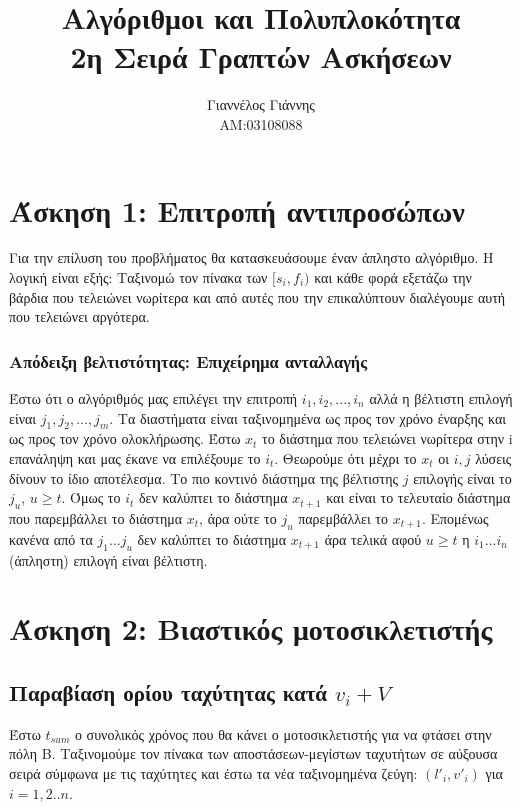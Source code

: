 \documentclass[a4paper,12pt]{report}
\title{ Αλγόριθμοι και Πολυπλοκότητα \\ 2η Σειρά Γραπτών Ασκήσεων}
\author{Γιαννέλος Γιάννης\\ΑΜ:03108088}
\begin{document}
\maketitle

\section*{Άσκηση 1: Επιτροπή αντιπροσώπων}
Για την επίλυση του προβλήματος θα κατασκευάσουμε έναν άπληστο αλγόριθμο. Η λογική είναι εξής: Ταξινομώ τον πίνακα των $[s_i,f_i)$ και κάθε φορά εξετάζω την βάρδια που τελειώνει νωρίτερα και από αυτές που την επικαλύπτουν διαλέγουμε αυτή που τελειώνει αργότερα.
\subsubsection*{Απόδειξη βελτιστότητας: Επιχείρημα ανταλλαγής}
Έστω ότι ο αλγόριθμός μας επιλέγει την επιτροπή $i_1,i_2,...,i_n$ αλλά η βέλτιστη επιλογή είναι $j_1,j_2,...,j_m$. Τα διαστήματα είναι ταξινομημένα ως προς τον χρόνο έναρξης και ως προς τον χρόνο ολοκλήρωσης. Έστω $x_t$ το διάστημα που τελειώνει νωρίτερα στην i επανάληψη και μας έκανε να επιλέξουμε το $i_t$. Θεωρούμε ότι μέχρι το $x_t$ οι $i,j$ λύσεις δίνουν το ίδιο αποτέλεσμα. Το πιο κοντινό διάστημα της βέλτιστης $j$ επιλογής είναι το $j_u$, $u\geq t$. Όμως το $i_t$ δεν καλύπτει το διάστημα $x_{t+1}$ και είναι το τελευταίο διάστημα που παρεμβάλλει το διάστημα $x_t$, άρα ούτε το $j_u$ παρεμβάλλει το $x_{t+1}$. Επομένως κανένα από τα $j_1...j_u$ δεν καλύπτει το διάστημα $x_{t+1}$ άρα τελικά αφού $u \geq t$ η $i_1...i_n$ (άπληστη) επιλογή είναι βέλτιστη.


\section*{Άσκηση 2: Βιαστικός μοτοσικλετιστής}
\subsection*{Παραβίαση ορίου ταχύτητας κατά $v_i+V$}
Έστω $t_{sum}$ ο συνολικός χρόνος που θα κάνει ο μοτοσικλετιστής για να φτάσει στην πόλη Β. Ταξινομούμε τον πίνακα των αποστάσεων-μεγίστων ταχυτήτων σε αύξουσα σειρά σύμφωνα με τις ταχύτητες και έστω τα νέα ταξινομημένα ζεύγη: $(l'_i,v'_i)$ για $i=1,2..n$.
\end{document}
